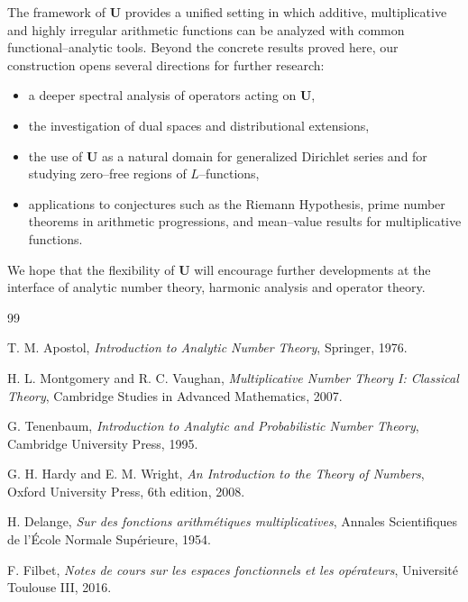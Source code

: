 \documentclass[11pt,a4paper]{article}
\theoremstyle{plain}
\theoremstyle{definition}
\theoremstyle{remark}
\begin{document}
The framework of $\mathbf{U}$ provides a unified setting in which additive,
multiplicative and highly irregular arithmetic functions can be analyzed
with common functional–analytic tools.  
Beyond the concrete results proved here, our construction opens several
directions for further research:
\begin{itemize}
	\item a deeper spectral analysis of operators acting on $\mathbf{U}$,
	\item the investigation of dual spaces and distributional extensions,
	\item the use of $\mathbf{U}$ as a natural domain for generalized
	Dirichlet series and for studying zero–free regions of $L$–functions,
	\item applications to conjectures such as the Riemann Hypothesis,
	prime number theorems in arithmetic progressions,
	and mean–value results for multiplicative functions.
\end{itemize}
We hope that the flexibility of $\mathbf{U}$ will encourage
further developments at the interface of analytic number theory,
harmonic analysis and operator theory.

\begin{thebibliography}{99}
	
	T. M. Apostol,
	\emph{Introduction to Analytic Number Theory},
	Springer, 1976.
	
	H. L. Montgomery and R. C. Vaughan,
	\emph{Multiplicative Number Theory I: Classical Theory},
	Cambridge Studies in Advanced Mathematics, 2007.
	
	G. Tenenbaum,
	\emph{Introduction to Analytic and Probabilistic Number Theory},
	Cambridge University Press, 1995.
	
	G. H. Hardy and E. M. Wright,
	\emph{An Introduction to the Theory of Numbers},
	Oxford University Press, 6th edition, 2008.
	
	H. Delange,
	\emph{Sur des fonctions arithmétiques multiplicatives},
	Annales Scientifiques de l'École Normale Supérieure, 1954.
	
	F. Filbet,
	\emph{Notes de cours sur les espaces fonctionnels et les opérateurs},
	Université Toulouse III, 2016.
	
\end{thebibliography}

	
\end{document}
